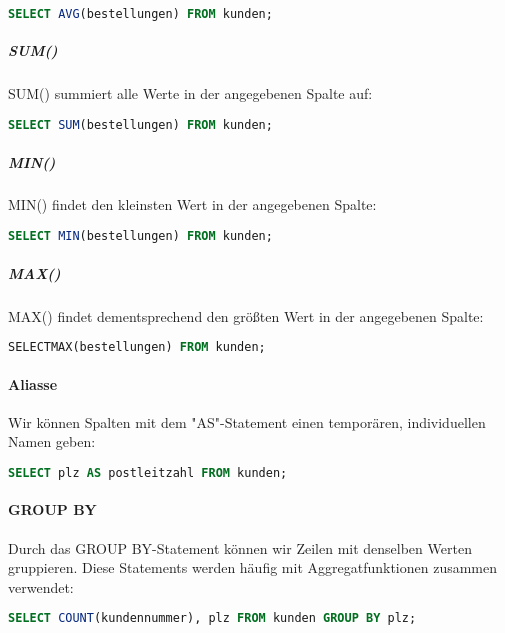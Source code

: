 \documentclass{article}
\begin{document}
	\begin{lstlisting}[language=SQL, caption=Durchschnittliche Bestellungen eines Kunden]
	SELECT AVG(bestellungen) FROM kunden;
	\end{lstlisting}

	\subparagraph{SUM()}
	SUM() summiert alle Werte in der angegebenen Spalte auf:

	\begin{lstlisting}[language=SQL, caption=Anzahl der Bestellungen aller Kunden]
	SELECT SUM(bestellungen) FROM kunden;
	\end{lstlisting}

	\subparagraph{MIN()}
	MIN() findet den kleinsten Wert in der angegebenen Spalte:

	\begin{lstlisting}[language=SQL, caption=Kleinste Anzahl an Bestellungen eines Kunden]
	SELECT MIN(bestellungen) FROM kunden;
	\end{lstlisting}

	\subparagraph{MAX()}
	MAX() findet dementsprechend den größten Wert in der angegebenen Spalte:

	\begin{lstlisting}[language=SQL, caption=Einzelner Kunde mit den meisten Bestellungen]
	SELECTMAX(bestellungen) FROM kunden;
	\end{lstlisting}

	\paragraph{Aliasse}
	Wir können Spalten mit dem "AS"-Statement einen temporären, individuellen Namen geben:

	\begin{lstlisting}[language=SQL, caption=Benennt die Spalte "plz" in "postleitzahl" um]
	SELECT plz AS postleitzahl FROM kunden;
	\end{lstlisting}

	\paragraph{GROUP BY}
	Durch das GROUP BY-Statement können wir Zeilen mit denselben Werten gruppieren. Diese Statements werden häufig mit Aggregatfunktionen zusammen verwendet:

	\begin{lstlisting}[language=SQL, caption=Nennt die Zahl der Kunden in den einzelnen Orten]
	SELECT COUNT(kundennummer), plz FROM kunden GROUP BY plz;
	\end{lstlisting}
\end{document}
